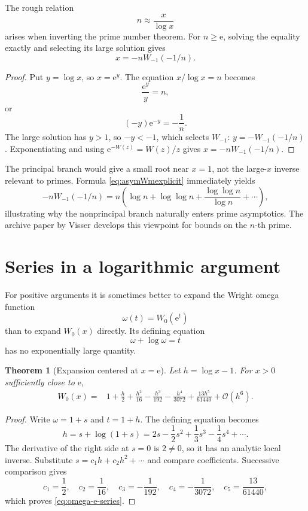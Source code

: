 \documentclass[11pt]{article}
\newtheorem{theorem}{Theorem}[section]
\theoremstyle{remark}
\newcommand{\ee}{\mathrm e}
\newcommand{\bigO}{\mathcal O}
\begin{document}
The rough relation
\[
       n\approx\frac{x}{\log x}
\]
arises when inverting the prime number theorem.  For \(n\geq\ee\), solving
the equality exactly and selecting its large solution gives
\begin{equation}\label{eq:primeinverse}
       x=-nW_{-1}(-1/n).
\end{equation}

\begin{proof}
Put \(y=\log x\), so \(x=\ee^y\).  The equation
\(x/\log x=n\) becomes
\[
       \frac{\ee^y}{y}=n,
\]
or
\[
       (-y)\ee^{-y}=-\frac1n.
\]
The large solution has \(y>1\), so \(-y<-1\), which selects \(W_{-1}\):
\(y=-W_{-1}(-1/n)\).  Exponentiating and using
\(\ee^{-W(z)}=W(z)/z\) gives
\(x=-nW_{-1}(-1/n)\).
\end{proof}

The principal branch would give a small root near \(x=1\), not the
large-\(x\) inverse relevant to primes.  Formula
\eqref{eq:asymWmexplicit} immediately yields
\[
 -nW_{-1}(-1/n)
 =n\left(\log n+\log\log n
 +\frac{\log\log n}{\log n}+\cdots\right),
\]
illustrating why the nonprincipal branch naturally enters prime asymptotics.
The archive paper by Visser develops this viewpoint for bounds on the
\(n\)-th prime.


\section{Series in a logarithmic argument}\label{sec:omega-series}

For positive arguments it is sometimes better to expand the Wright omega
function
\[
       \omega(t)=W_0(\ee^t)
\]
than to expand \(W_0(x)\) directly.  Its defining equation
\[
       \omega+\log\omega=t
\]
has no exponentially large quantity.

\begin{theorem}[Expansion centered at \(x=\ee\)]\label{thm:omega-e-series}
Let \(h=\log x-1\).  For \(x>0\) sufficiently close to \(\ee\),
\begin{align}
 W_0(x)
 ={}&1+\frac h2+\frac{h^2}{16}
 -\frac{h^3}{192}-\frac{h^4}{3072}
 +\frac{13h^5}{61440}
 +\bigO(h^6).\label{eq:omega-e-series}
\end{align}
\end{theorem}

\begin{proof}
Write \(\omega=1+s\) and \(t=1+h\).  The defining equation becomes
\[
       h=s+\log(1+s)
        =2s-\frac12s^2+\frac13s^3-\frac14s^4+\cdots.
\]
The derivative of the right side at \(s=0\) is \(2\neq0\), so it has an
analytic local inverse.  Substitute
\(s=c_1h+c_2h^2+\cdots\) and compare coefficients.  Successive comparison
gives
\[
 c_1=\frac12,\quad c_2=\frac1{16},\quad
 c_3=-\frac1{192},\quad c_4=-\frac1{3072},\quad
 c_5=\frac{13}{61440},
\]
which proves \eqref{eq:omega-e-series}.
\end{proof}
\end{document}
